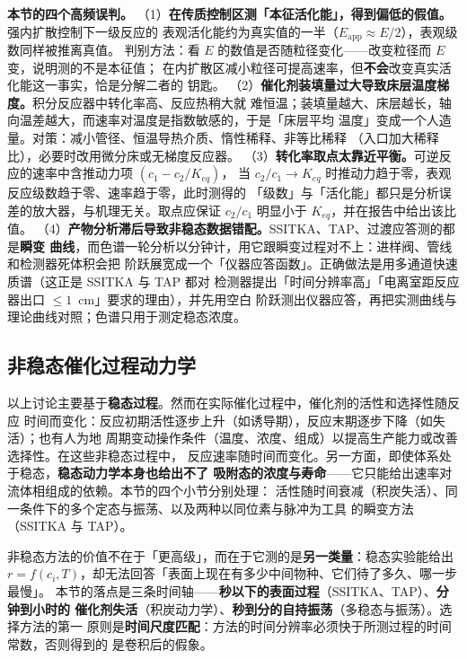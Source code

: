 \begin{pitfall}
\textbf{本节的四个高频误判。}
（1）\textbf{在传质控制区测「本征活化能」，得到偏低的假值。}强内扩散控制下一级反应的
表观活化能约为真实值的一半（$E_{\mathrm{app}}\approx E/2$），表观级数同样被推离真值。
判别方法：看 $E$ 的数值是否随粒径变化——改变粒径而 $E$ 变，说明测的不是本征值；
在内扩散区减小粒径可提高速率，但\textbf{不会}改变真实活化能这一事实，恰是分解二者的
钥匙。
（2）\textbf{催化剂装填量过大导致床层温度梯度。}积分反应器中转化率高、反应热稍大就
难恒温；装填量越大、床层越长，轴向温差越大，而速率对温度是指数敏感的，于是「床层平均
温度」变成一个人造量。对策：减小管径、恒温导热介质、惰性稀释、非等比稀释
（入口加大稀释比），必要时改用微分床或无梯度反应器。
（3）\textbf{转化率取点太靠近平衡。}可逆反应的速率中含推动力项 $(c_1-c_2/K_{eq})$，
当 $c_2/c_1\to K_{eq}$ 时推动力趋于零，表观反应级数趋于零、速率趋于零，此时测得的
「级数」与「活化能」都只是分析误差的放大器，与机理无关。取点应保证
$c_2/c_1$ 明显小于 $K_{eq}$，并在报告中给出该比值。
（4）\textbf{产物分析滞后导致非稳态数据错配。}SSITKA、TAP、过渡应答测的都是\textbf{瞬变
曲线}，而色谱一轮分析以分钟计，用它跟瞬变过程对不上：进样阀、管线和检测器死体积会把
阶跃展宽成一个「仪器应答函数」。正确做法是用多通道快速质谱（这正是 SSITKA 与 TAP 都对
检测器提出「时间分辨率高」「电离室距反应器出口 $\le 1$~cm」要求的理由），并先用空白
阶跃测出仪器应答，再把实测曲线与理论曲线对照；色谱只用于测定稳态浓度。
\end{pitfall}

\subsection{非稳态催化过程动力学}

以上讨论主要基于\textbf{稳态过程}。然而在实际催化过程中，催化剂的活性和选择性随反应
时间而变化：反应初期活性逐步上升（如诱导期），反应末期逐步下降（如失活）；也有人为地
周期变动操作条件（温度、浓度、组成）以提高生产能力或改善选择性。在这些非稳态过程中，
反应速率随时间而变化。另一方面，即使体系处于稳态，\textbf{稳态动力学本身也给出不了
吸附态的浓度与寿命}——它只能给出速率对流体相组成的依赖。本节的四个小节分别处理：
活性随时间衰减（积炭失活）、同一条件下的多个定态与振荡、以及两种以同位素与脉冲为工具
的瞬变方法（SSITKA 与 TAP）。

\begin{probout}
非稳态方法的价值不在于「更高级」，而在于它测的是\textbf{另一类量}：稳态实验能给出
$r=f(c_i,T)$，却无法回答「表面上现在有多少中间物种、它们待了多久、哪一步最慢」。
本节的落点是三条时间轴——\textbf{秒以下的表面过程}（SSITKA、TAP）、\textbf{分钟到小时的
催化剂失活}（积炭动力学）、\textbf{秒到分的自持振荡}（多稳态与振荡）。选择方法的第一
原则是\textbf{时间尺度匹配}：方法的时间分辨率必须快于所测过程的时间常数，否则得到的
是卷积后的假象。
\end{probout}


